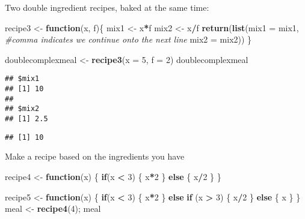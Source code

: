 \documentclass[
]{article}
\newenvironment{Shaded}{\begin{snugshade}}{\end{snugshade}}
\newcommand{\CommentTok}[1]{\textcolor[rgb]{0.56,0.35,0.01}{\textit{#1}}}
\newcommand{\ControlFlowTok}[1]{\textcolor[rgb]{0.13,0.29,0.53}{\textbf{#1}}}
\newcommand{\DataTypeTok}[1]{\textcolor[rgb]{0.13,0.29,0.53}{#1}}
\newcommand{\DecValTok}[1]{\textcolor[rgb]{0.00,0.00,0.81}{#1}}
\newcommand{\KeywordTok}[1]{\textcolor[rgb]{0.13,0.29,0.53}{\textbf{#1}}}
\newcommand{\NormalTok}[1]{#1}
\newcommand{\OperatorTok}[1]{\textcolor[rgb]{0.81,0.36,0.00}{\textbf{#1}}}
\newcommand{\StringTok}[1]{\textcolor[rgb]{0.31,0.60,0.02}{#1}}
\begin{document}
Two double ingredient recipes, baked at the same time:

\begin{Shaded}
\begin{Highlighting}[]
\NormalTok{recipe3 <-}\StringTok{ }\ControlFlowTok{function}\NormalTok{(x, f)\{}
\NormalTok{  mix1 <-}\StringTok{ }\NormalTok{x}\OperatorTok{*}\NormalTok{f}
\NormalTok{  mix2 <-}\StringTok{ }\NormalTok{x}\OperatorTok{/}\NormalTok{f}
  \KeywordTok{return}\NormalTok{(}\KeywordTok{list}\NormalTok{(}\DataTypeTok{mix1 =}\NormalTok{ mix1, }\CommentTok{#comma indicates we continue onto the next line}
              \DataTypeTok{mix2 =}\NormalTok{ mix2))}
\NormalTok{\}}

\NormalTok{doublecomplexmeal <-}\StringTok{ }\KeywordTok{recipe3}\NormalTok{(}\DataTypeTok{x =} \DecValTok{5}\NormalTok{, }\DataTypeTok{f =} \DecValTok{2}\NormalTok{)}
\NormalTok{doublecomplexmeal}
\end{Highlighting}
\end{Shaded}

\begin{verbatim}
## $mix1
## [1] 10
## 
## $mix2
## [1] 2.5
\end{verbatim}

\begin{Shaded}
\end{Shaded}

\begin{verbatim}
## [1] 10
\end{verbatim}

Make a recipe based on the ingredients you have

\begin{Shaded}
\begin{Highlighting}[]
\NormalTok{recipe4 <-}\StringTok{ }\ControlFlowTok{function}\NormalTok{(x) \{}
  \ControlFlowTok{if}\NormalTok{(x }\OperatorTok{<}\StringTok{ }\DecValTok{3}\NormalTok{) \{}
\NormalTok{    x}\OperatorTok{*}\DecValTok{2}
\NormalTok{  \} }
  \ControlFlowTok{else}\NormalTok{ \{}
\NormalTok{    x}\OperatorTok{/}\DecValTok{2}
\NormalTok{  \}}
\NormalTok{\}}

\NormalTok{recipe5 <-}\StringTok{ }\ControlFlowTok{function}\NormalTok{(x) \{}
  \ControlFlowTok{if}\NormalTok{(x }\OperatorTok{<}\StringTok{ }\DecValTok{3}\NormalTok{) \{}
\NormalTok{    x}\OperatorTok{*}\DecValTok{2}
\NormalTok{  \} }
  \ControlFlowTok{else} \ControlFlowTok{if}\NormalTok{ (x }\OperatorTok{>}\StringTok{ }\DecValTok{3}\NormalTok{) \{}
\NormalTok{    x}\OperatorTok{/}\DecValTok{2}
\NormalTok{  \}}
  \ControlFlowTok{else}\NormalTok{ \{}
\NormalTok{    x}
\NormalTok{  \}}
\NormalTok{\}}
\NormalTok{meal <-}\StringTok{ }\KeywordTok{recipe4}\NormalTok{(}\DecValTok{4}\NormalTok{); meal}
\end{Highlighting}
\end{Shaded}
\end{document}
